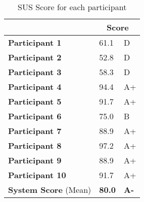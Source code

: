 \documentclass[../main.tex]{subfiles}
\begin{document}
\begin{table}
\centering
\setlength{\tabcolsep}{10pt}
\renewcommand{\arraystretch}{1.5}
\begin{tabular}{|p{4cm}|p{2cm}p{2cm}|}
\hline
                        & \multicolumn{2}{c|}{\textbf{Score}} \\ \hline
\rowcolor[HTML]{EFEFEF} 
\textbf{Participant 1}  & 61.1              & D              \\
\textbf{Participant 2}  & 52.8              & D              \\
\rowcolor[HTML]{EFEFEF} 
\textbf{Participant 3}  & 58.3              & D              \\
\textbf{Participant 4}  & 94.4              & A+              \\
\rowcolor[HTML]{EFEFEF} 
\textbf{Participant 5}  & 91.7              & A+              \\
\textbf{Participant 6}  & 75.0              & B              \\
\rowcolor[HTML]{EFEFEF} 
\textbf{Participant 7}  & 88.9              & A+              \\
\textbf{Participant 8}  & 97.2              & A+              \\
\rowcolor[HTML]{EFEFEF} 
\textbf{Participant 9}  & 88.9              & A+              \\
\textbf{Participant 10} & 91.7              & A+              \\ \hline
\rowcolor[HTML]{EFEFEF} 
\textbf{System Score} (Mean)        & \textbf{80.0}     & \textbf{A-}     \\ \hline
\end{tabular}
\caption{SUS Score for each participant}%
\end{table}
\end{document}
